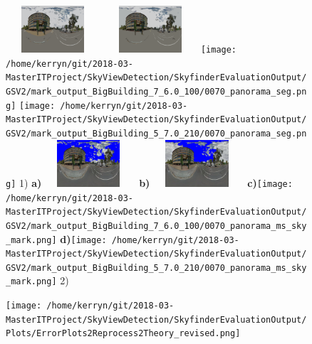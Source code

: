 \documentclass{article}
\begin{document}
\begin{figure}
\centering  
\textbf{}\includegraphics[width=3.50cm,height=1.75cm]{Images/mean/4880_7_6_100.png} 
\textbf{}\includegraphics[width=3.50cm,height=1.75cm]{Images/mean/4880_5_7_210.png} 
\textbf{}\texttt{[image: /home/kerryn/git/2018-03-MasterITProject/SkyViewDetection/SkyfinderEvaluationOutput/GSV2/mark\_output\_BigBuilding\_7\_6.0\_100/0070\_panorama\_seg.png]} 
\textbf{}\texttt{[image: /home/kerryn/git/2018-03-MasterITProject/SkyViewDetection/SkyfinderEvaluationOutput/GSV2/mark\_output\_BigBuilding\_5\_7.0\_210/0070\_panorama\_seg.png]} 
\scriptsize{1)}
\textbf{\textbf{\scriptsize{a)}}}\includegraphics[width=3.50cm,height=1.75cm]{Images/mean/4880_7_6_100_ms_sky_mark.png} 
\textbf{\textbf{\scriptsize{b)}}}\includegraphics[width=3.50cm,height=1.75cm]{Images/mean/4880_5_7_210_ms_sky_mark.png} 
\textbf{\scriptsize{c)}}\texttt{[image: /home/kerryn/git/2018-03-MasterITProject/SkyViewDetection/SkyfinderEvaluationOutput/GSV2/mark\_output\_BigBuilding\_7\_6.0\_100/0070\_panorama\_ms\_sky\_mark.png]} 
\textbf{\scriptsize{d)}}\texttt{[image: /home/kerryn/git/2018-03-MasterITProject/SkyViewDetection/SkyfinderEvaluationOutput/GSV2/mark\_output\_BigBuilding\_5\_7.0\_210/0070\_panorama\_ms\_sky\_mark.png]} 
\scriptsize{2)}

\end{figure} 

\clearpage


\begin{figure}
\centering  
\texttt{[image: /home/kerryn/git/2018-03-MasterITProject/SkyViewDetection/SkyfinderEvaluationOutput/Plots/ErrorPlots2Reprocess2Theory\_revised.png]}
\end{figure} 
\end{document}
